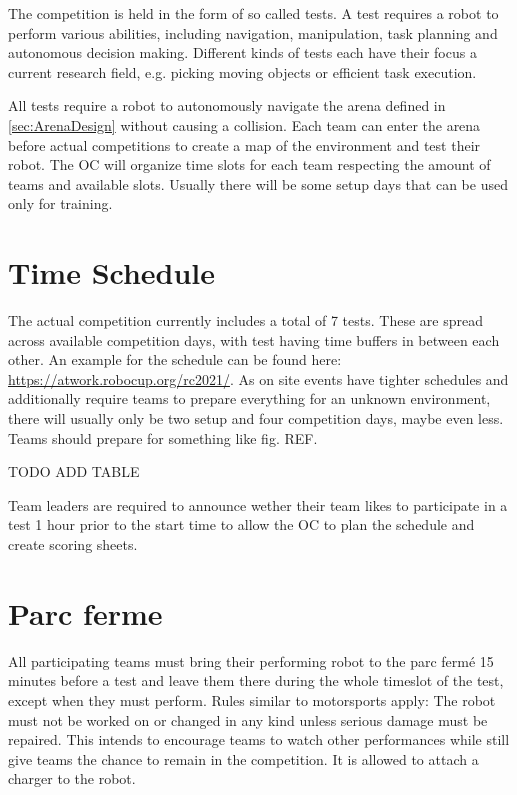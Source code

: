 \label{sec:Competition}

The competition is held in the form of so called tests.
A test requires a robot to perform various abilities, including navigation, manipulation, task planning and autonomous decision making.
Different kinds of tests each have their focus a current research field, e.g. picking moving objects or efficient task execution.

All tests require a robot to autonomously navigate the arena defined in \ref{sec:ArenaDesign} without causing a collision. Each team can enter the arena before actual competitions to create a map of the environment and test their robot. The OC will organize time slots for each team respecting the amount of teams and available slots. Usually there will be some setup days that can be used only for training.

\section{Time Schedule}

The actual competition currently includes a total of 7 tests.
These are spread across available competition days, with test having time buffers in between each other.
An example for the schedule can be found here: \url{https://atwork.robocup.org/rc2021/}.
As on site events have tighter schedules and additionally require teams to prepare everything for an unknown environment, there will usually only be two setup and four competition days, maybe even less.
Teams should prepare for something like fig. REF. 

TODO ADD TABLE 

Team leaders are required to announce wether their team likes to participate in a test 1 hour prior to the start time to allow the OC to plan the schedule and create scoring sheets.

\section{Parc ferme}

All participating teams must bring their performing robot to the parc fermé 15 minutes before a test and leave them there during the whole timeslot of the test, except when they must perform.
Rules similar to motorsports apply: The robot must not be worked on or changed in any kind unless
serious damage must be repaired. This intends to encourage teams to watch other performances while still give teams the chance to remain in the competition. It is allowed to attach a charger to the robot.

